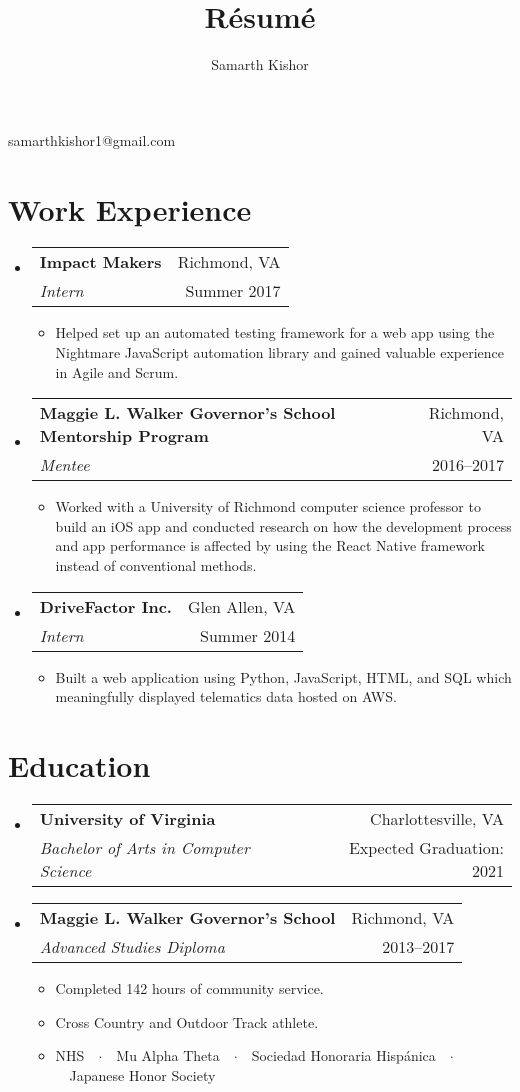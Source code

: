 \documentclass{article}
\makeatletter
\renewcommand{\maketitle}{
\begin{center}
{\huge\bfseries\theauthor}

\vspace{0.25em}

samarthkishor1@gmail.com

\end{center}
}
\newcommand{\resumeSubHeadingListStart}{\begin{itemize}[leftmargin=*]}
\newcommand{\resumeSubHeadingListEnd}{\end{itemize}}
\newcommand{\workSubheading}[5]{
\item
\begin{tabular*}{\textwidth}{l@{\extracolsep{\fill}}r}
\textbf{\large#1} & #2 \\
\textit{#3} & #4
\end{tabular*}
\vspace{-1em}
\begin{itemize}
\item #5
\end{itemize}
\vspace{0.25em}
}
\newcommand{\eduSubheading}[4]{
\item
\begin{tabular*}{\textwidth}{l@{\extracolsep{\fill}}r}
\textbf{\large#1} & #2 \\
\textit{#3} & #4
\end{tabular*}
}
\makeatother
\begin{document}
\title{R\'esum\'e}
\author{Samarth Kishor}

\maketitle


\section{Work Experience}

\resumeSubHeadingListStart
    \workSubheading{Impact Makers}{Richmond, VA}
    {Intern}{Summer 2017}
    {Helped set up an automated testing framework for a web app using the Nightmare JavaScript automation library and gained valuable experience in Agile and Scrum.}
    
    \workSubheading{Maggie L. Walker Governor's School Mentorship Program}{Richmond, VA}
    {Mentee}{2016--2017}
    {Worked with a University of Richmond computer science professor to build an iOS app and conducted research on how the development process and app performance is affected by using the React Native framework instead of conventional methods.}
    
    \workSubheading{DriveFactor Inc.}{Glen Allen, VA}
    {Intern}{Summer 2014}
    {Built a web application using Python, JavaScript, HTML, and SQL which meaningfully displayed telematics data hosted on AWS.}
\resumeSubHeadingListEnd


\section{Education}

\resumeSubHeadingListStart
    \eduSubheading{University of Virginia}{Charlottesville, VA}
    {Bachelor of Arts in Computer Science}{Expected Graduation: 2021}
    
    \eduSubheading{Maggie L. Walker Governor's School}{Richmond, VA}
    {Advanced Studies Diploma}{2013--2017}
    \vspace{-1em}
    \begin{itemize}
    \item Completed 142 hours of community service.
    \item Cross Country and Outdoor Track athlete.
    \item NHS\ \ $\cdotp$\ \ Mu Alpha Theta\ \ $\cdotp$\ \ Sociedad Honoraria Hisp\'anica\ \ $\cdotp$\ \ Japanese Honor Society
    \end{itemize}
\resumeSubHeadingListEnd
\end{document}
